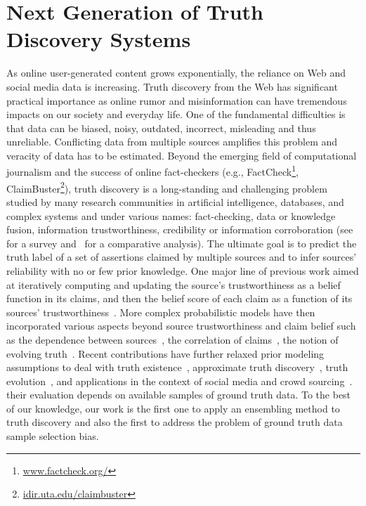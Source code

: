 \documentclass[prodmode,acmtecs]{acmsmall} %
\begin{document}
\section*{Next Generation of Truth Discovery Systems}
As online user-generated content grows exponentially,
the reliance on Web and social 
media data is increasing.  Truth discovery from 
the Web has significant practical importance as online rumor and misinformation
can have tremendous impacts on our society and everyday life.
One of the fundamental difficulties is that data can be biased, noisy, outdated, incorrect, misleading and
thus unreliable. Conflicting data from multiple sources amplifies this problem and veracity of data has to be estimated.  Beyond the emerging field of computational journalism and the success of online fact-checkers (e.g., FactCheck\footnote{\url{www.factcheck.org/}}, ClaimBuster\footnote{\url{idir.uta.edu/claimbuster}}), 
 truth discovery is a long-standing and challenging problem studied by many research communities in artificial intelligence, databases, and complex systems and under various 
names: fact-checking, data or knowledge fusion,  information trustworthiness, credibility or information corroboration (see \cite{Berti2015} for a survey and~\cite{BW2014} for a comparative analysis).  The ultimate goal  is to predict the truth label of a set of assertions claimed by multiple sources
 and to infer sources' reliability with no or few prior knowledge. One 
major line of previous work  aimed at iteratively computing and updating the source's
trustworthiness as a belief function in its claims, and then the belief score of each claim as a function of its sources' trustworthiness~\cite{YinHY08}. More complex probabilistic models have then incorporated various aspects beyond source trustworthiness and claim belief such as the dependence between sources~\cite{Dong:2010,DongBHS10a}, the correlation of claims~\cite{Pochampally2014}, the notion of evolving truth~\cite{DongBS09a}.  Recent contributions have further relaxed prior modeling assumptions to deal with truth existence~\cite{ZhiZTGYJH15}, approximate truth discovery~\cite{Wang2015a,LiLGSZDFH14},  truth evolution~\cite{LiLGSZFH15,JiaWLG13}, and applications in the context of social media and  crowd sourcing~\cite{GaoLZFH15,MaLLQGZSZJH15}. %
their evaluation depends on available samples of ground truth data. To the best of our knowledge, our  work is the first one to apply an ensembling method to truth discovery  and also the first to address the problem of ground truth data sample selection bias. 
\end{document}
